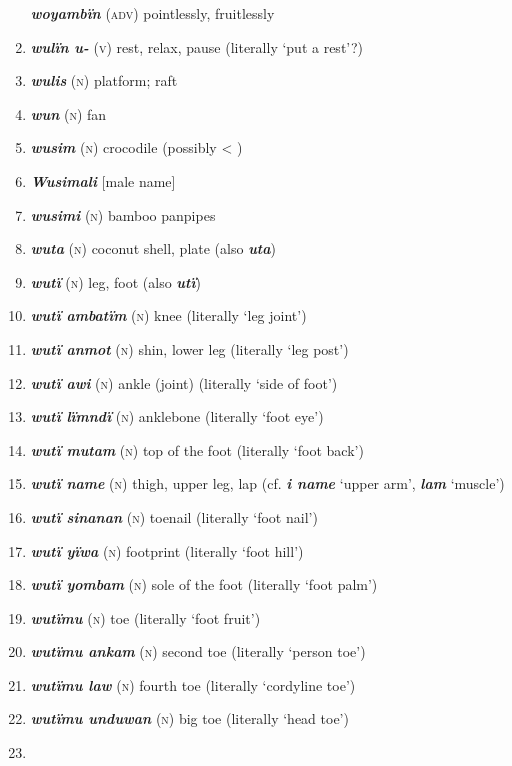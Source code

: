 \begin{enumerate}[noitemsep, label={}, align=left, widest=190, labelsep=1ex,leftmargin=*,itemindent=-10pt]
\textbf{\textit{woyambïn}} (\textsc{adv)} pointlessly, fruitlessly \item 
\textbf{\textit{wulïn u-}} (\textsc{v}) rest, relax, pause (literally ‘put a rest’?) \item 
\textbf{\textit{wulis}} (\textsc{n}) platform; raft \item 
\textbf{\textit{wun}} (\textsc{n}) fan \item 
\textbf{\textit{wusim}} (\textsc{n}) crocodile (possibly < ) \item 
\textbf{\textit{Wusimali}} [male name] \item 
\textbf{\textit{wusimi}} (\textsc{n}) bamboo panpipes \item 
\textbf{\textit{wuta}} (\textsc{n}) coconut shell, plate (also \textbf{\textit{uta}}) \item 
\textbf{\textit{wutï}} (\textsc{n}) leg, foot (also \textbf{\textit{utï}}) \item 
\textbf{\textit{wutï ambatïm}} (\textsc{n}) knee (literally ‘leg joint’) \item 
\textbf{\textit{wutï anmot}} (\textsc{n}) shin, lower leg (literally ‘leg post’) \item 
\textbf{\textit{wutï awi}} (\textsc{n}) ankle (joint) (literally ‘side of foot’) \item 
\textbf{\textit{wutï lïmndï}} (\textsc{n}) anklebone (literally ‘foot eye’) \item 
\textbf{\textit{wutï mutam}} (\textsc{n}) top of the foot (literally ‘foot back’) \item 
\textbf{\textit{wutï name}} (\textsc{n}) thigh, upper leg, lap (cf. \textbf{\textit{i name}} ‘upper arm’, \textbf{\textit{lam}} ‘muscle’) \item 
\textbf{\textit{wutï sinanan}} (\textsc{n}) toenail (literally ‘foot nail’) \item 
\textbf{\textit{wutï yïwa}} (\textsc{n}) footprint (literally ‘foot hill’) \item 
\textbf{\textit{wutï yombam}} (\textsc{n}) sole of the foot (literally ‘foot palm’) \item 
\textbf{\textit{wutïmu}} (\textsc{n}) toe (literally ‘foot fruit’) \item 
\textbf{\textit{wutïmu ankam}} (\textsc{n}) second toe (literally ‘person toe’) \item 
\textbf{\textit{wutïmu law}} (\textsc{n}) fourth toe (literally ‘cordyline toe’) \item 
\textbf{\textit{wutïmu unduwan}} (\textsc{n}) big toe (literally ‘head toe’) \item 

\end{enumerate}
